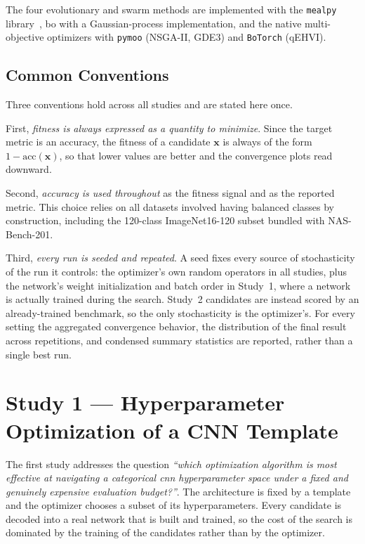 The four evolutionary and swarm methods are implemented with the \texttt{mealpy} library~\cite{van2023mealpy}, \acrshort{bo} with a Gaussian-process implementation, and the native multi-objective optimizers with \texttt{pymoo} (NSGA-II, GDE3) and \texttt{BoTorch} (qEHVI).

\subsection{Common Conventions}
\label{subsec:common_conventions}

Three conventions hold across all studies and are stated here once.

First, \emph{fitness is always expressed as a quantity to minimize}. Since the target metric is an accuracy, the fitness of a candidate $\mathbf{x}$ is always of the form $1 - \mathrm{acc}(\mathbf{x})$, so that lower values are better and the convergence plots read downward.

Second, \emph{accuracy is used throughout} as the fitness signal and as the reported metric. This choice relies on all datasets involved having balanced classes by construction, including the 120-class ImageNet16-120 subset bundled with NAS-Bench-201.

Third, \emph{every run is seeded and repeated}. A seed fixes every source of stochasticity of the run it controls: the optimizer's own random operators in all studies, plus the network's weight initialization and batch order in Study~1, where a network is actually trained during the search. Study~2 candidates are instead scored by an already-trained benchmark, so the only stochasticity is the optimizer's. For every setting the aggregated convergence behavior, the distribution of the final result across repetitions, and condensed summary statistics are reported, rather than a single best run.


\section{Study 1 --- Hyperparameter Optimization of a CNN Template}
\label{sec:study_1}

The first study addresses the question \emph{``which optimization algorithm is most effective at navigating a categorical \acrshort{cnn} hyperparameter space under a fixed and genuinely expensive evaluation budget?''}. The architecture is fixed by a template and the optimizer chooses a subset of its hyperparameters. Every candidate is decoded into a real network that is built and trained, so the cost of the search is dominated by the training of the candidates rather than by the optimizer.

